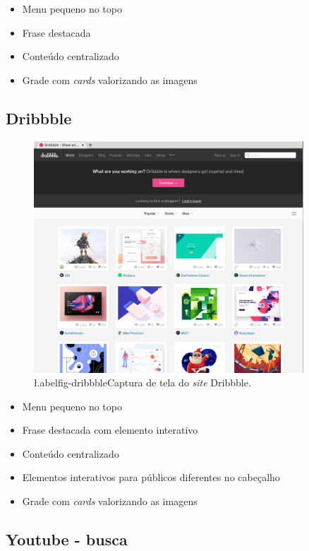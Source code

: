 \begin{itemize}
\tightlist
\item
  Menu pequeno no topo
\item
  Frase destacada
\item
  Conteúdo centralizado
\item
  Grade com \emph{cards} valorizando as imagens
\end{itemize}

\subsection{Dribbble}\label{dribbble}

\begin{figure}[!htbp]
\centering
\caption{\l.abel{fig-dribbble}Captura de tela do \emph{site} Dribbble.}
\includegraphics[width=0.9\textwidth]{images/tendencias/dribbble.png}
\end{figure}

\begin{itemize}
\tightlist
\item
  Menu pequeno no topo
\item
  Frase destacada com elemento interativo
\item
  Conteúdo centralizado
\item
  Elementos interativos para públicos diferentes no cabeçalho
\item
  Grade com \emph{cards} valorizando as imagens
\end{itemize}

\subsection{Youtube - busca}\label{youtube---busca}

